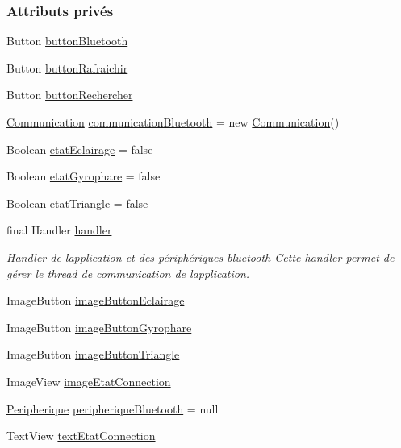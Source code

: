 \subsubsection*{Attributs privés}
\begin{DoxyCompactItemize}
\item 
Button \hyperlink{classcom_1_1lasalle_1_1io__trucks_1_1_main_activity_a2197b0145db353437c41d1fc57f28650}{button\+Bluetooth}
\item 
Button \hyperlink{classcom_1_1lasalle_1_1io__trucks_1_1_main_activity_ac138932ce8d8dd12d7eb35496a1c9a16}{button\+Rafraichir}
\item 
Button \hyperlink{classcom_1_1lasalle_1_1io__trucks_1_1_main_activity_a74b2f440caeb7d27d9bd62d87f106156}{button\+Rechercher}
\item 
\hyperlink{classcom_1_1lasalle_1_1io__trucks_1_1_communication}{Communication} \hyperlink{classcom_1_1lasalle_1_1io__trucks_1_1_main_activity_aef1818afc9c0d071330ccc244e4b3794}{communication\+Bluetooth} = new \hyperlink{classcom_1_1lasalle_1_1io__trucks_1_1_communication}{Communication}()
\item 
Boolean \hyperlink{classcom_1_1lasalle_1_1io__trucks_1_1_main_activity_a345177f9fe1d73a402a57ce992a5aa1a}{etat\+Eclairage} = false
\item 
Boolean \hyperlink{classcom_1_1lasalle_1_1io__trucks_1_1_main_activity_ac19484cc818434d89d35933a8cbb2b63}{etat\+Gyrophare} = false
\item 
Boolean \hyperlink{classcom_1_1lasalle_1_1io__trucks_1_1_main_activity_a25509a0ae84110cdb8957c51b149213f}{etat\+Triangle} = false
\item 
final Handler \hyperlink{classcom_1_1lasalle_1_1io__trucks_1_1_main_activity_a16435e06fc13fa3938f40a1bd5e1eb0b}{handler}
\begin{DoxyCompactList}\small\item\em Handler de l\textquotesingle{}application et des périphériques bluetooth Cette handler permet de gérer le thread de communication de l\textquotesingle{}application. \end{DoxyCompactList}\item 
Image\+Button \hyperlink{classcom_1_1lasalle_1_1io__trucks_1_1_main_activity_a1cc3f48aebca6c187b2a964fa6f569fc}{image\+Button\+Eclairage}
\item 
Image\+Button \hyperlink{classcom_1_1lasalle_1_1io__trucks_1_1_main_activity_aed3dc707e8acf48e821ebda3312a0dca}{image\+Button\+Gyrophare}
\item 
Image\+Button \hyperlink{classcom_1_1lasalle_1_1io__trucks_1_1_main_activity_abe65c5762df1b63ee18b51fcb1bb23c8}{image\+Button\+Triangle}
\item 
Image\+View \hyperlink{classcom_1_1lasalle_1_1io__trucks_1_1_main_activity_aa9d2b0a05a522c372879d3c35294d7bc}{image\+Etat\+Connection}
\item 
\hyperlink{classcom_1_1lasalle_1_1io__trucks_1_1_peripherique}{Peripherique} \hyperlink{classcom_1_1lasalle_1_1io__trucks_1_1_main_activity_a0c0b8e9294fa6c74c52886cb50687f18}{peripherique\+Bluetooth} = null
\item 
Text\+View \hyperlink{classcom_1_1lasalle_1_1io__trucks_1_1_main_activity_a62ce189c543dda03ed48e00c10623677}{text\+Etat\+Connection}
\end{DoxyCompactItemize}
